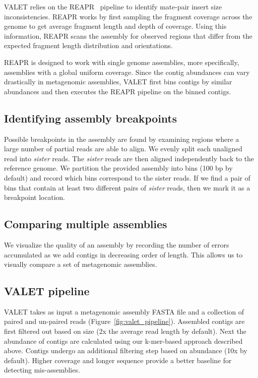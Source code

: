 \documentclass[12pt,\mydriver]{thesis}
\begin{document}
VALET relies on the REAPR~\cite{hunt2013reapr} pipeline to identify mate-pair insert size inconsistencies.  REAPR works by first sampling the fragment coverage across the genome to get average fragment length and depth of coverage.  Using this information, REAPR scans the assembly for observed regions that differ from the expected fragment length distribution and orientations.

REAPR is designed to work with single genome assemblies, more specifically, assemblies with a global uniform coverage.  Since the contig abundances can vary drastically in metagenomic assemblies, VALET first bins contigs by similar abundances and then executes the REAPR pipeline on the binned contigs.

\subsection{Identifying assembly breakpoints}

Possible breakpoints in the assembly are found by examining regions where a large number of partial reads are able to align.
We evenly split each unaligned read into \emph{sister} reads.
The \emph{sister} reads are then aligned independently back to the reference genome.
We partition the provided assembly into bins (100 bp by default) and record which bins correspond to the sister reads.
If we find a pair of bins that contain at least two different pairs of \textit{sister} reads, then we mark it as a breakpoint location.

\subsection{Comparing multiple assemblies}

We visualize the quality of an assembly by recording the number of errors accumulated as we add contigs in decreasing order of length.
This allows us to visually compare a set of metagenomic assemblies.

\subsection{VALET pipeline}

VALET takes as input a metagenomic assembly \textsc{FASTA} file and a collection of paired and un-paired reads (Figure~\ref{fig:valet_pipeline}).
Assembled contigs are first filtered out based on size (2x the average read length by default).
Next the abundance of contigs are calculated using our k-mer-based approach described above.
Contigs undergo an additional filtering step based on abundance (10x by default).
Higher coverage and longer sequence provide a better baseline for detecting mis-assemblies.
\end{document}
